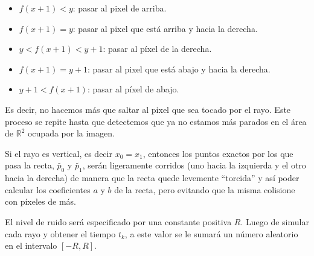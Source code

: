 \documentclass[a4paper]{article}
\begin{document}
\begin{itemize}
\item $f(x+1) < y$: pasar al pixel de arriba.
\item $f(x+1) = y$: pasar al pixel que está arriba y hacia la derecha.
\item $y < f(x+1) < y+1$: pasar al píxel de la derecha.
\item $f(x+1) = y+1$: pasar al pixel que está abajo y hacia la derecha.
\item $y+1 < f(x+1)$: pasar al píxel de abajo.
\end{itemize}


Es decir, no hacemos más que saltar al pixel que sea tocado por el rayo. Este proceso se repite hasta que detectemos que ya no estamos más parados 
en el área de $\mathbb{R}^2$ ocupada por la imagen.

Si el rayo es vertical, es decir $x_0 = x_1$, entonces los puntos exactos por los que pasa la recta, $\tilde{p_0}$ y $\tilde{p_1}$, serán ligeramente 
corridos (uno hacia la izquierda y el otro hacia la derecha) de manera que la recta quede levemente ``torcida'' y así poder calcular los coeficientes 
$a$ y $b$ de la recta, pero evitando que la misma colisione con píxeles de más.

El nivel de ruido será especificado por una constante positiva $R$. Luego de simular cada rayo y obtener el tiempo $t_k$, a este valor se le sumará 
un número aleatorio en el intervalo $[-R,R]$.
\end{document}
